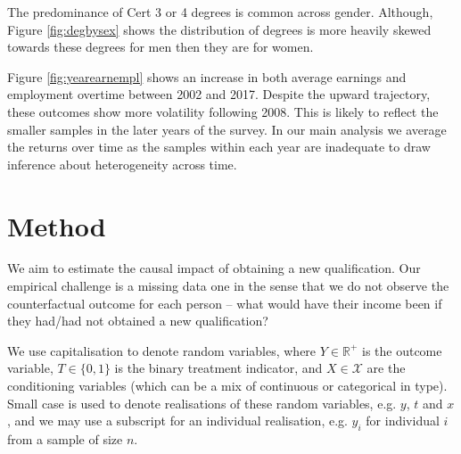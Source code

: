 \documentclass[12pt, a4paper]{article}
\begin{document}

The predominance of Cert 3 or 4 degrees is common across gender. Although, Figure \ref{fig:degbysex} shows the distribution of degrees is more heavily skewed towards these degrees for men then they are for women. 

Figure \ref{fig:yearearnempl} shows an increase in both average earnings and employment overtime between 2002 and 2017. Despite the upward trajectory, these outcomes show more volatility following 2008. This is likely to reflect the smaller samples in the later years of the survey. In our main analysis we average the returns over time as the samples within each year are inadequate to draw inference about heterogeneity across time.




\section{Method}

We aim to estimate the causal impact of obtaining a new qualification. Our empirical challenge is a missing data one in the sense that we do not observe the counterfactual outcome for each person -- what would have their income been if they had/had not obtained a new qualification?

We use capitalisation to denote random variables, where $Y \in \mathbb{R}^+$ is
the outcome variable, $T \in \{0, 1\}$ is the binary treatment indicator, and
$X \in \mathcal{X}$ are the conditioning variables (which can be a mix of
continuous or categorical in type). Small case is used to denote realisations
of these random variables, e.g. $y$, $t$ and $x$, and we may use a subscript
for an individual realisation, e.g. $y_i$ for individual $i$ from a sample of
size $n$.
\end{document}
